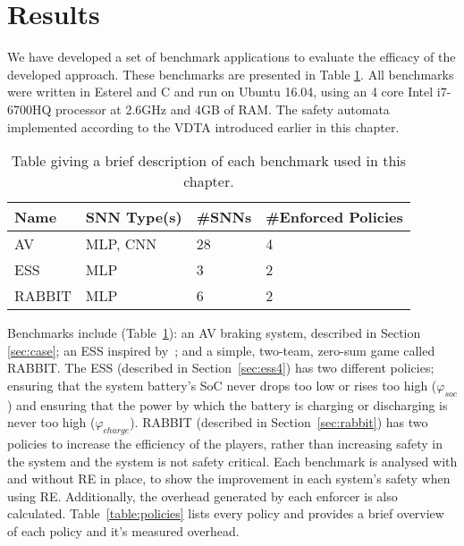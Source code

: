 
\section{Results}
\label{sec:resultsc4}

We have developed a set of benchmark applications to evaluate the efficacy of the developed approach.
These benchmarks are presented in Table \ref{table:benchmarks4}.
All benchmarks were written in Esterel and C and run on Ubuntu 16.04, using an 4 core Intel i7-6700HQ processor at 2.6GHz and 4GB of RAM.
The safety automata implemented according to the \ac{VDTA} introduced earlier in this chapter.

\begin{table}[h]
	\centering
	\caption{Table giving a brief description of each benchmark used in this chapter.}
	\label{table:benchmarks4}
	\begin{tabular}{@{}|l|l|l|l|@{}}
		\hline
		Name & \ac{SNN} Type(s) & \#\acp{SNN} & \#Enforced Policies \\ \hline
		\acs{AV} & \ac{MLP}, \ac{CNN}  & 28 & 4 \\
		\acs{ESS} & \ac{MLP} & 3 & 2 \\
		RABBIT & \ac{MLP}  & 6 & 2 \\
		\hline
	\end{tabular}
\end{table}

Benchmarks include (Table~\ref{table:benchmarks4}): an \acf{AV} braking system, described in Section \ref{sec:case}; an \acf{ESS} inspired by~\cite{chaudhari2017hybrid}; and a simple, two-team, zero-sum game called RABBIT.
The \ac{ESS} (described in Section~\ref{sec:ess4}) has two different policies; ensuring that the system battery's \ac{SoC} never drops too low or rises too high  ($\varphi_{soc}$) and ensuring that the power by which the battery is charging or discharging is never too high ($\varphi_{charge}$).
RABBIT (described in Section~\ref{sec:rabbit}) has two policies to increase the efficiency of the players, rather than increasing safety in the system and the system is not safety critical.
Each benchmark is analysed with and without \ac{RE} in place, to show the improvement in each system's safety when using \ac{RE}.
Additionally, the overhead generated by each enforcer is also calculated. 
Table~\ref{table:policies} lists every policy and provides a brief overview of each policy and it's measured overhead. 

